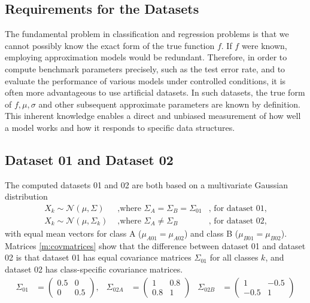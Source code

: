 \documentclass[12pt,a4paper,titlepage]{article}
\numberwithin{equation}{section}
\numberwithin{table}{section}
\numberwithin{figure}{section}
\begin{document}
    \subsection{Requirements for the Datasets}\label{Requirements for the datasets}
    The fundamental problem in classification and regression problems is that we cannot possibly know the exact form of the true function $f$. If $f$ were known, employing approximation models would be redundant.
    Therefore, in order to compute benchmark parameters precisely, such as the test error rate, and to evaluate the performance of various models under controlled conditions, it is often more advantageous to use artificial datasets. In such datasets, the true form of $f, \mu, \sigma$ and other subsequent approximate parameters are known by definition. This inherent knowledge enables a direct and unbiased measurement of how well a model works and how it responds to specific data structures.
    
    \subsection{Dataset 01 and Dataset 02}\label{Dataset 0102}
    The computed datasets 01 and 02 are both based on a multivariate Gaussian distribution
    \begin{align}
    X_k \sim \mathcal{N} (\mu, \Sigma) & \text{ ,where }\Sigma_A = \Sigma_B = \Sigma_{01}&\text{, for dataset 01}, \\
    X_k \sim \mathcal{N} (\mu, \Sigma_k) & \text{ ,where }\Sigma_A \neq \Sigma_B & \text{, for dataset 02},
    \end{align}
    with equal mean vectors for class A ($\mu_{A01}=\mu_{A02}$) and class B ($\mu_{B01}=\mu_{B02}$). Matrices \ref{m:covmatrices} show that the difference between dataset 01 and dataset 02 is that dataset 01 has equal covariance matrices $\Sigma_{01}$ for all classes $k$, and dataset 02 has class-specific covariance matrices.
    \begin{align}\label{m:covmatrices}
    \Sigma_{01} &= \begin{pmatrix}
        0.5 & 0 \\
        0   & 0.5
    \end{pmatrix}, &
    \Sigma_{02A} &= \begin{pmatrix}
        1 & 0.8 \\
        0.8 & 1
    \end{pmatrix} &
    \Sigma_{02B} &= \begin{pmatrix}
        1 & -0.5 \\
        -0.5 & 1
    \end{pmatrix}
    \end{align}
    
\end{document}
